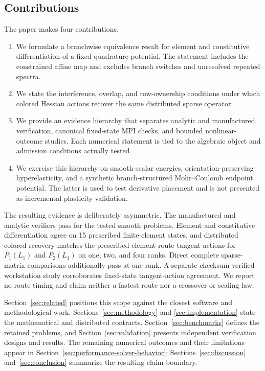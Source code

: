 \subsection{Contributions}
\label{subsec:intro-contributions}

The paper makes four contributions.
\begin{enumerate}
  \item We formulate a branchwise equivalence result for element and
        constitutive differentiation of a fixed quadrature potential. The
        statement includes the constrained affine map and excludes branch
        switches and unresolved repeated spectra.
  \item We state the interference, overlap, and row-ownership conditions under
        which colored Hessian actions recover the same distributed sparse
        operator.
  \item We provide an evidence hierarchy that separates analytic and
        manufactured verification, canonical fixed-state MPI checks, and
        bounded nonlinear-outcome studies. Each numerical statement is tied to
        the algebraic object and admission conditions actually tested.
  \item We exercise this hierarchy on smooth scalar energies,
        orientation-preserving hyperelasticity, and a synthetic
        branch-structured Mohr--Coulomb endpoint potential. The latter is used
        to test derivative placement and is not presented as incremental
        plasticity validation.
\end{enumerate}

The resulting evidence is deliberately asymmetric. The manufactured and
analytic verifiers pass for the tested smooth problems. Element and
constitutive differentiation agree on 15 prescribed finite-element states, and
distributed colored recovery matches the prescribed element-route tangent
actions for $P_1(L_1)$ and $P_2(L_1)$ on one, two, and four ranks. Direct
complete sparse-matrix comparisons additionally pass at one rank. A separate
checksum-verified workstation study corroborates fixed-state tangent-action
agreement. We report no route timing and claim neither a fastest route nor a
crossover or scaling law.

Section~\ref{sec:related} positions this scope against the closest software and
methodological work. Sections~\ref{sec:methodology} and
\ref{sec:implementation} state the mathematical and distributed contracts.
Section~\ref{sec:benchmarks} defines the retained problems, and
Section~\ref{sec:validation} presents independent verification designs and
results. The remaining numerical outcomes and their limitations appear in
Section~\ref{sec:performance-solver-behavior}; Sections~\ref{sec:discussion}
and~\ref{sec:conclusion} summarize the resulting claim boundary.
